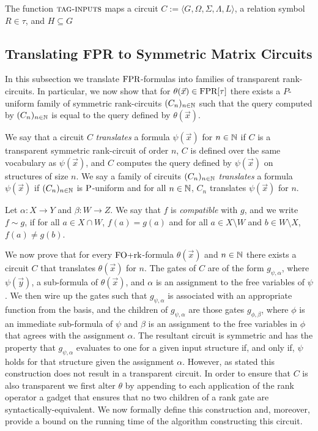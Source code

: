 \documentclass[../paper.tex]{subfiles}
\begin{document}
\begin{definition}
  The function ${\normalfont\textsc{tag-inputs}}$ maps a circuit $C := \langle G, \Omega, \Sigma,
  \Lambda, L \rangle$, a relation symbol $R \in \tau$, and $H \subseteq G$
\end{definition}

\subsection{Translating FPR to Symmetric Matrix Circuits}
In this subsection we translate $\text{\upshape FPR}$-formulas into families of transparent
rank-circuits. In particular, we now show that for $\theta(\vec{x}) \in
\text{\upshape FPR}[\tau]$ there exists a $P$-uniform family of symmetric rank-circuits
$(C_n)_{n \in \mathbb{N}}$ such that the query computed by $(C_n)_{n \in \mathbb{N}}$ is
equal to the query defined by $\theta (\vec{x})$.

We say that a circuit $C$ \emph{translates} a formula $\psi(\vec{x})$ for $n \in
\mathbb{N}$ if $C$ is a transparent symmetric rank-circuit of order $n$, $C$ is
defined over the same vocabulary as $\psi (\vec{x})$, and $C$ computes the query
defined by $\psi(\vec{x})$ on structures of size $n$. We say a family of
circuits $(C_n)_{n \in \mathbb{N}}$ \emph{translates} a formula $\psi (\vec{x})$ if
$(C_n)_{n \in \mathbb{N}}$ is $\mathrm{P}$-uniform and for all $n \in \mathbb{N}$, $C_n$
translates $\psi(\vec{x})$ for $n$.

\begin{definition}
	Let $\alpha : X \rightarrow Y$ and $\beta : W \rightarrow Z$. We say that $f$
  is \emph{compatible} with $g$, and we write $f \sim g$, if for all $a \in X
  \cap W$, $f(a) = g(a)$ and for all $a \in X \setminus W$ and $b \in W
  \setminus X$, $f(a) \neq g(b)$.
\end{definition}

We now prove that for every $\text{\upshape FO+rk}$-formula $\theta(\vec{x})$ and $n \in \mathbb{N}$
there exists a circuit $C$ that translates $\theta(\vec{x})$ for $n$. The gates
of $C$ are of the form $g_{\psi, \alpha}$, where $\psi(\vec{y})$, a sub-formula
of $\theta(\vec{x})$, and $\alpha$ is an assignment to the free variables of
$\psi$. We then wire up the gates such that $g_{\psi, \alpha}$ is associated
with an appropriate function from the basis, and the children of $g_{\psi,
  \alpha} $ are those gates $g_{\phi, \beta}$, where $\phi$ is an immediate
sub-formula of $\psi$ and $\beta$ is an assignment to the free variables in
$\phi$ that agrees with the assignment $\alpha$. The resultant circuit is
symmetric and has the property that $g_{\psi, \alpha}$ evaluates to one for a
given input structure if, and only if, $\psi$ holds for that structure given the
assignment $\alpha$. However, as stated this construction does not result in a
transparent circuit. In order to ensure that $C$ is also transparent we first
alter $\theta$ by appending to each application of the rank operator a gadget
that ensures that no two children of a rank gate are syntactically-equivalent.
We now formally define this construction and, moreover, provide a bound on the
running time of the algorithm constructing this circuit.
\end{document}
